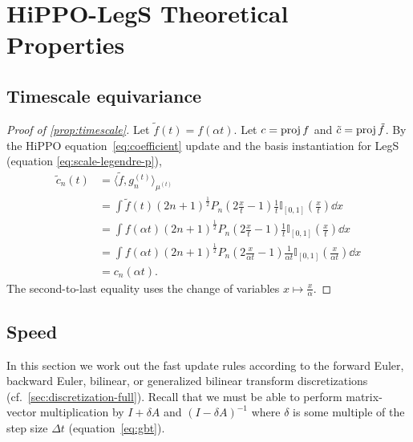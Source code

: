 \documentclass[../hippo.tex]{subfiles}
\begin{document}
\section{HiPPO-LegS Theoretical Properties}
\label{sec:hippo-theory}

\subsection{Timescale equivariance}

\begin{proof}[Proof of \cref{prop:timescale}]%
    Let $\tilde{f}(t) = f(\alpha t)$.
    Let $c = \operatorname{proj} f$ and $\tilde{c} = \operatorname{proj} \tilde{f}$.
    By the HiPPO equation~\eqref{eq:coefficient} update and the basis
    instantiation for LegS (equation \eqref{eq:scale-legendre-p}),
    \begin{align*}%
        \tilde{c}_n(t) &= \langle \tilde{f}, g_n^{(t)} \rangle_{\mu^{(t)}} \\
        &= \int \tilde{f}(t) (2n+1)^{\frac{1}{2}} P_n\left( 2\frac{x}{t} - 1 \right) \frac{1}{t} \mathbb{I}_{[0, 1]}\left(\frac{x}{t}\right) \dd x
        \\
        &= \int f(\alpha t) (2n+1)^{\frac{1}{2}} P_n\left( 2\frac{x}{t} - 1 \right) \frac{1}{t} \mathbb{I}_{[0, 1]}\left(\frac{x}{t}\right) \dd x
        \\
        &= \int f(\alpha t) (2n+1)^{\frac{1}{2}} P_n\left( 2\frac{x}{\alpha t} - 1 \right) \frac{1}{\alpha t} \mathbb{I}_{[0, 1]}\left(\frac{x}{\alpha t}\right) \dd x
        \\
        &= c_n(\alpha t).
    \end{align*}
    The second-to-last equality uses the change of variables $x \mapsto \frac{x}{\alpha}$.
\end{proof}

\subsection{Speed}





In this section we work out the fast update rules according to the forward
Euler, backward Euler, bilinear, or generalized bilinear transform
discretizations (cf.\ \cref{sec:discretization-full}).
Recall that we must be able to perform matrix-vector multiplication by $I + \delta A$ and $(I - \delta A)^{-1}$
where $\delta$ is some multiple of the step size $\Delta t$ (equation~\eqref{eq:gbt}).
\end{document}
